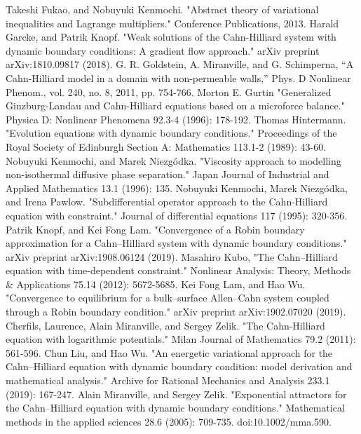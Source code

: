 \documentclass[a4paper]{jsarticle}
\begin{document}
\begin{thebibliography}{99}
		Takeshi Fukao, and Nobuyuki Kenmochi. "Abstract theory of variational inequalities and Lagrange multipliers." Conference Publications, 2013.
		Harald Garcke, and Patrik Knopf. "Weak solutions of the Cahn-Hilliard system with dynamic boundary conditions: A gradient flow approach." arXiv preprint arXiv:1810.09817 (2018).
		G. R. Goldstein, A. Miranville, and G. Schimperna, “A Cahn-Hilliard model in a domain with non-permeable walls,” Phys. D Nonlinear Phenom., vol. 240, no. 8, 2011, pp. 754-766.
		Morton E. Gurtin "Generalized Ginzburg-Landau and Cahn-Hilliard equations based on a microforce balance." Physica D: Nonlinear Phenomena 92.3-4 (1996): 178-192.
		Thomas Hintermann. "Evolution equations with dynamic boundary conditions." Proceedings of the Royal Society of Edinburgh Section A: Mathematics 113.1-2 (1989): 43-60.
		Nobuyuki Kenmochi, and Marek Niezgódka. "Viscosity approach to modelling non-isothermal diffusive phase separation." Japan Journal of Industrial and Applied Mathematics 13.1 (1996): 135.
		Nobuyuki Kenmochi, Marek Niezg\'odka, and Irena Pawlow. "Subdifferential operator approach to the Cahn-Hilliard equation with constraint." Journal of differential equations 117 (1995): 320-356.
		Patrik Knopf, and Kei Fong Lam. "Convergence of a Robin boundary approximation for a Cahn--Hilliard system with dynamic boundary conditions." arXiv preprint arXiv:1908.06124 (2019).
		Masahiro Kubo, "The Cahn–Hilliard equation with time-dependent constraint." Nonlinear Analysis: Theory, Methods \& Applications 75.14 (2012): 5672-5685.
		Kei Fong Lam, and Hao Wu. "Convergence to equilibrium for a bulk--surface Allen--Cahn system coupled through a Robin boundary condition." arXiv preprint arXiv:1902.07020 (2019).
		Cherfils, Laurence, Alain Miranville, and Sergey Zelik. "The Cahn-Hilliard equation with logarithmic potentials." Milan Journal of Mathematics 79.2 (2011): 561-596.
		Chun Liu, and Hao Wu. "An energetic variational approach for the Cahn–Hilliard equation with dynamic boundary condition: model derivation and mathematical analysis." Archive for Rational Mechanics and Analysis 233.1 (2019): 167-247.
		Alain Miranville, and Sergey Zelik. "Exponential attractors for the Cahn–Hilliard equation with dynamic boundary conditions." Mathematical methods in the applied sciences 28.6 (2005): 709-735. doi:10.1002/mma.590.

\end{thebibliography}
\end{document}
